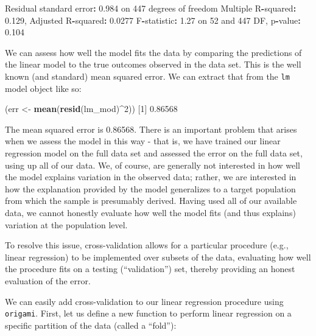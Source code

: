\documentclass[12pt, krantz2,]{krantz}
\newenvironment{Shaded}{\begin{snugshade}}{\end{snugshade}}
\newcommand{\DecValTok}[1]{\textcolor[rgb]{0.06,0.06,0.06}{#1}}
\newcommand{\FloatTok}[1]{\textcolor[rgb]{0.06,0.06,0.06}{#1}}
\newcommand{\KeywordTok}[1]{\textcolor[rgb]{0.27,0.27,0.27}{\textbf{#1}}}
\newcommand{\NormalTok}[1]{#1}
\newcommand{\OperatorTok}[1]{\textcolor[rgb]{0.43,0.43,0.43}{\textbf{#1}}}
\newcommand{\StringTok}[1]{\textcolor[rgb]{0.5,0.5,0.5}{#1}}
\theoremstyle{definition}
\theoremstyle{definition}
\theoremstyle{definition}
\newcommand{\1}{\mathbbm{1}}
\begin{document}
\begin{Shaded}
\begin{Highlighting}[]
\NormalTok{Residual standard error}\OperatorTok{:}\StringTok{ }\FloatTok{0.984}\NormalTok{ on }\DecValTok{447}\NormalTok{ degrees of freedom}
\NormalTok{Multiple R}\OperatorTok{-}\NormalTok{squared}\OperatorTok{:}\StringTok{  }\FloatTok{0.129}\NormalTok{, Adjusted R}\OperatorTok{-}\NormalTok{squared}\OperatorTok{:}\StringTok{  }\FloatTok{0.0277} 
\NormalTok{F}\OperatorTok{-}\NormalTok{statistic}\OperatorTok{:}\StringTok{ }\FloatTok{1.27}\NormalTok{ on }\DecValTok{52}\NormalTok{ and }\DecValTok{447}\NormalTok{ DF,  p}\OperatorTok{-}\NormalTok{value}\OperatorTok{:}\StringTok{ }\FloatTok{0.104}
\end{Highlighting}
\end{Shaded}

We can assess how well the model fits the data by comparing the predictions of
the linear model to the true outcomes observed in the data set. This is the well
known (and standard) mean squared error. We can extract that from the \texttt{lm} model
object like so:

\begin{Shaded}
\begin{Highlighting}[]
\NormalTok{(err <-}\StringTok{ }\KeywordTok{mean}\NormalTok{(}\KeywordTok{resid}\NormalTok{(lm_mod)}\OperatorTok{^}\DecValTok{2}\NormalTok{))}
\NormalTok{[}\DecValTok{1}\NormalTok{] }\FloatTok{0.86568}
\end{Highlighting}
\end{Shaded}

The mean squared error is 0.86568. There is an important problem that arises
when we assess the model in this way - that is, we have trained our linear
regression model on the full data set and assessed the error on the full data
set, using up all of our data. We, of course, are generally not interested in
how well the model explains variation in the observed data; rather, we are
interested in how the explanation provided by the model generalizes to a target
population from which the sample is presumably derived. Having used all of our
available data, we cannot honestly evaluate how well the model fits (and thus
explains) variation at the population level.

To resolve this issue, cross-validation allows for a particular procedure (e.g.,
linear regression) to be implemented over subsets of the data, evaluating how
well the procedure fits on a testing (``validation'') set, thereby providing an
honest evaluation of the error.

We can easily add cross-validation to our linear regression procedure using
\texttt{origami}. First, let us define a new function to perform linear regression on a
specific partition of the data (called a ``fold''):
\end{document}
